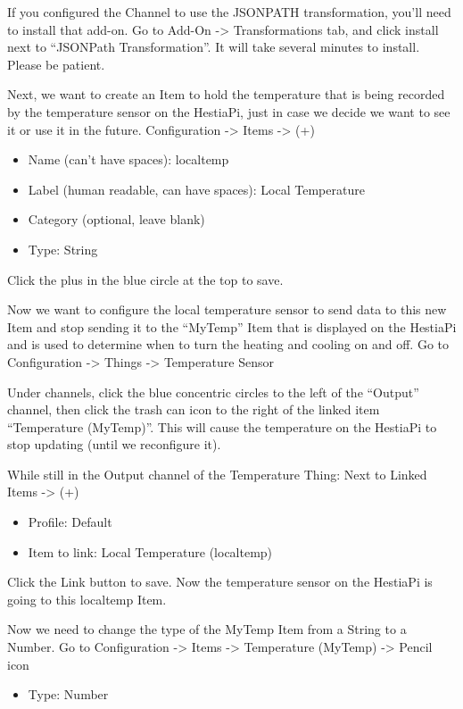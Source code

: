 If you configured the Channel to use the JSONPATH transformation, you'll need
to install that add-on. Go to Add-On -> Transformations tab, and click install
next to ``JSONPath Transformation''. It will take several minutes to install.
Please be patient.

Next, we want to create an Item to hold the temperature that is being recorded
by the temperature sensor on the HestiaPi, just in case we decide we want to
see it or use it in the future. Configuration -> Items -> (+)

\begin{itemize}
\item Name (can’t have spaces): localtemp
\item Label (human readable, can have spaces): Local Temperature
\item Category (optional, leave blank)
\item Type: String
\end{itemize}

Click the plus in the blue circle at the top to save.

Now we want to configure the local temperature sensor to send data to this new
Item and stop sending it to the ``MyTemp'' Item that is displayed on the
HestiaPi and is used to determine when to turn the heating and cooling on and
off. Go to Configuration -> Things -> Temperature Sensor

Under channels, click the blue concentric circles to the left of the ``Output''
channel, then click the trash can icon to the right of the linked item
``Temperature (MyTemp)''. This will cause the temperature on the HestiaPi to
stop updating (until we reconfigure it).

While still in the Output channel of the Temperature Thing: Next to Linked
Items -> (+)

\begin{itemize}
\item Profile: Default
\item Item to link: Local Temperature (localtemp)
\end{itemize}

Click the Link button to save. Now the temperature sensor on the HestiaPi
is going to this localtemp Item.

Now we need to change the type of the MyTemp Item from a String to a Number.
Go to Configuration -> Items -> Temperature (MyTemp) -> Pencil icon

\begin{itemize}
\item Type: Number
\end{itemize}

